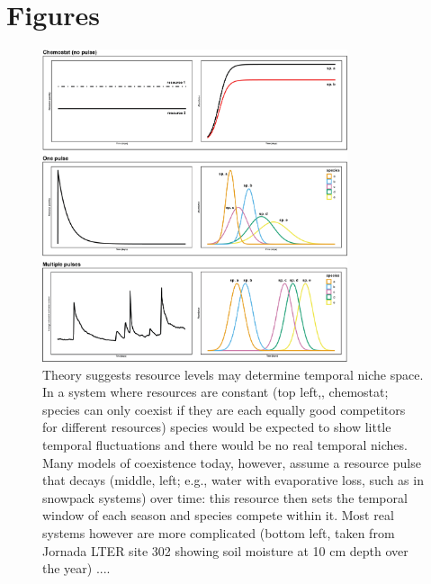 \documentclass[11pt]{article}
\begin{document}
\section{Figures}
\begin{figure}[h!]
\centering
\includegraphics[width=0.8\textwidth]{..//figures/JN_conceptfigs/sixpanel_concept.png}
\caption{Theory suggests resource levels may determine temporal niche space. In a system where resources are constant (top left,, chemostat; species can only coexist if they are each equally good competitors for different resources) species would be expected to show little temporal fluctuations and there would be no real temporal niches. Many models of coexistence today, however, assume a resource pulse that decays (middle, left; e.g., water with evaporative loss, such as in snowpack systems) over time: this resource then sets the temporal window of each season and species compete within it. Most real systems however are more complicated (bottom left, taken from Jornada LTER site 302 showing soil moisture at 10 cm depth over the year) ....} 
 \label{fig:resource}
\end{figure}
\end{document}
